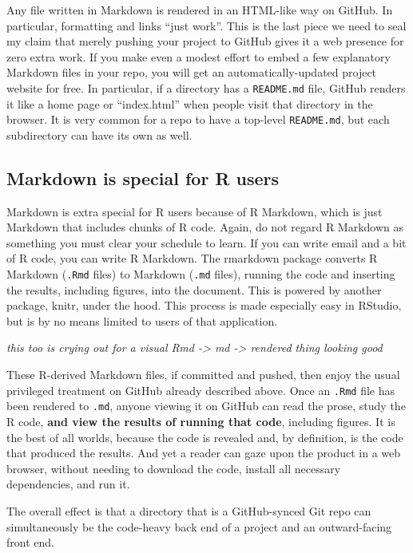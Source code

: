 \documentclass[12pt]{article}
\begin{document}
Any file written in Markdown is rendered in an HTML-like way on GitHub.
In particular, formatting and links ``just work''. This is the last
piece we need to seal my claim that merely pushing your project to
GitHub gives it a web presence for zero extra work. If you make even a
modest effort to embed a few explanatory Markdown files in your repo,
you will get an automatically-updated project website for free. In
particular, if a directory has a \texttt{README.md} file, GitHub renders
it like a home page or ``index.html'' when people visit that directory
in the browser. It is very common for a repo to have a top-level
\texttt{README.md}, but each subdirectory can have its own as well.

\subsection{Markdown is special for R
users}\label{markdown-is-special-for-r-users}

Markdown is extra special for R users because of R Markdown, which is
just Markdown that includes chunks of R code. Again, do not regard R
Markdown as something you must clear your schedule to learn. If you can
write email and a bit of R code, you can write R Markdown. The rmarkdown
package converts R Markdown (\texttt{.Rmd} files) to Markdown
(\texttt{.md} files), running the code and inserting the results,
including figures, into the document. This is powered by another
package, knitr, under the hood. This process is made especially easy in
RStudio, but is by no means limited to users of that application.

\emph{this too is crying out for a visual Rmd -\textgreater{} md
-\textgreater{} rendered thing looking good}

These R-derived Markdown files, if committed and pushed, then enjoy the
usual privileged treatment on GitHub already described above. Once an
\texttt{.Rmd} file has been rendered to \texttt{.md}, anyone viewing it
on GitHub can read the prose, study the R code, \textbf{and view the
results of running that code}, including figures. It is the best of all
worlds, because the code is revealed and, by definition, is the code
that produced the results. And yet a reader can gaze upon the product in
a web browser, without needing to download the code, install all
necessary dependencies, and run it.

The overall effect is that a directory that is a GitHub-synced Git repo
can simultaneously be the code-heavy back end of a project and an
outward-facing front end.
\end{document}
